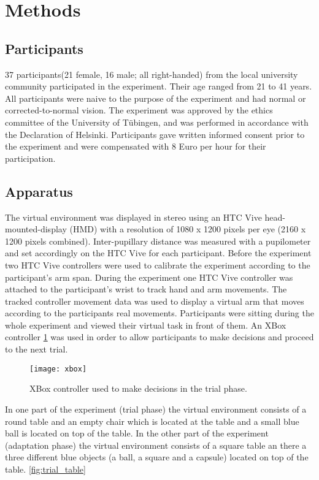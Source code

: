\section{Methods}

\subsection{Participants}
37 participants(21 female, 16 male; all right-handed) from the local university community participated in the experiment. Their age ranged from 21 to 41 years. All participants were naive to the purpose of the experiment and had normal or corrected-to-normal vision. The experiment was approved by the ethics committee of the University of T\"ubingen, and was performed in accordance with the Declaration of Helsinki. Participants gave written informed consent prior to the experiment and were compensated with 8 Euro per hour for their participation. 

\subsection{Apparatus}
The virtual environment was displayed in stereo using an HTC Vive head-mounted-display (HMD) with a resolution of 1080 x 1200 pixels per eye (2160 x 1200 pixels combined). Inter-pupillary distance was measured with a pupilometer and set accordingly on the HTC Vive for each participant. Before the experiment two HTC Vive controllers were used to calibrate the experiment according to the participant's arm span. During the experiment one HTC Vive controller was attached to the participant's wrist to track hand and arm movements. The tracked controller movement data was used to display a virtual arm that moves according to the participants real movements. Participants were sitting during the whole experiment and viewed their virtual task in front of them. An XBox controller \ref{fig:xbox} was used in order to allow participants to make decisions and proceed to the next trial.

\begin{figure}
\centering
  \texttt{[image: xbox]}
  \caption{XBox controller used to make decisions in the trial phase.} 
  \label{fig:xbox}
\end{figure}

In one part of the experiment (trial phase) the virtual environment consists of a round table and an empty chair which is located at the table and a small blue ball is located on top of the table. In the other part of the experiment (adaptation phase) the virtual environment consists of a square table an there a three different blue objects (a ball, a square and a capsule) located on top of the table. \ref{fig:trial_table}

